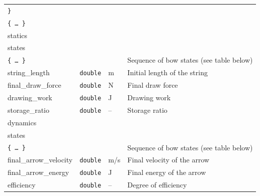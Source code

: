 \documentclass[12pt]{article}
\begin{document}
\begin{table}[H]
{\begin{tabular}{ l | l | l | l }
\quad\quad \texttt{\}} & & & \\
\quad\quad \texttt{\{\ \ldots\ \}} & & & \\
\tablespace statics & & & \\
\quad states & & & \\
\quad\quad \texttt{\{\ \ldots\ \}} & & & Sequence of bow states (see table below) \\
\tablespace\quad string\_length & \texttt{double} & \unit[]{m} & Initial length of the string \\
\quad final\_draw\_force & \texttt{double} & \unit[]{N} & Final draw force \\
\quad drawing\_work & \texttt{double} & \unit[]{J} & Drawing work \\
\quad storage\_ratio & \texttt{double} & -- & Storage ratio \\
\tablespace dynamics & & & \\
\quad states & & & \\
\quad\quad \texttt{\{\ \ldots\ \}} & & & Sequence of bow states (see table below) \\
\tablespace\quad final\_arrow\_velocity & \texttt{double} & \unit[]{m/s} & Final velocity of the arrow \\
\quad final\_arrow\_energy & \texttt{double} & \unit[]{J} & Final energy of the arrow \\
\quad efficiency & \texttt{double} & -- & Degree of efficiency \smallskip\bigskip
\end{tabular}}
\end{table}
\end{document}
